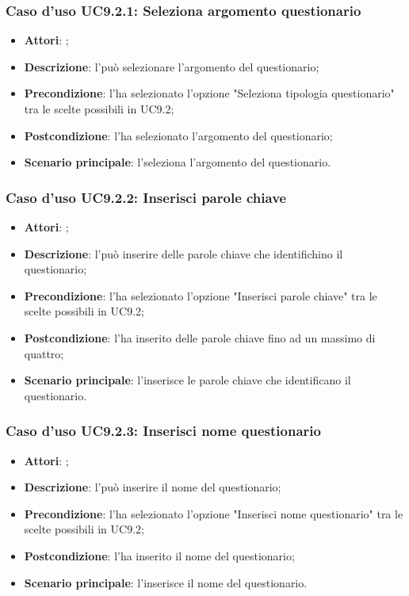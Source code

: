		\subsubsection{Caso d'uso UC9.2.1: Seleziona argomento questionario}
		\label{UC9.2.1}
		\begin{itemize}
			\item \textbf{Attori}: \uaupro;
			\item \textbf{Descrizione}: l'\uaupro può selezionare l'argomento del questionario; 
			\item \textbf{Precondizione}: l'\uaupro ha selezionato l'opzione "Seleziona tipologia questionario" tra le scelte possibili in UC9.2;
			\item \textbf{Postcondizione}: l'\uaupro ha selezionato l'argomento del questionario;
			\item \textbf{Scenario principale}: l'\uaupro seleziona l'argomento del questionario.
		\end{itemize}
		
		\subsubsection{Caso d'uso UC9.2.2: Inserisci parole chiave}
		\label{UC9.2.2}
		\begin{itemize}
			\item \textbf{Attori}: \uaupro;
			\item \textbf{Descrizione}: l'\uaupro può inserire delle parole chiave che identifichino il questionario; 
			\item \textbf{Precondizione}: l'\uaupro ha selezionato l'opzione "Inserisci parole chiave" tra le scelte possibili in UC9.2;
			\item \textbf{Postcondizione}: l'\uaupro ha inserito delle parole chiave fino ad un massimo di quattro; 
			\item \textbf{Scenario principale}: l'\uaupro inserisce le parole chiave che identificano il questionario.
		\end{itemize}
			
		\subsubsection{Caso d'uso UC9.2.3: Inserisci nome questionario}
		\label{UC9.2.3}
		\begin{itemize}
			\item \textbf{Attori}: \uaupro;
			\item \textbf{Descrizione}: l'\uaupro può inserire il nome del questionario; 
			\item \textbf{Precondizione}: l'\uaupro ha selezionato l'opzione "Inserisci nome questionario" tra le scelte possibili in UC9.2;
			\item \textbf{Postcondizione}: l'\uaupro ha inserito il nome del questionario; 
			\item \textbf{Scenario principale}: l'\uaupro inserisce il nome del questionario.
		\end{itemize}
				
